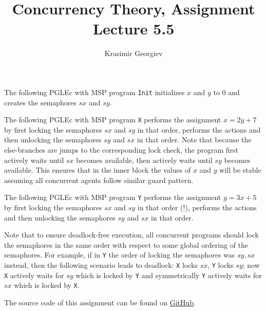 \documentclass[a4paper]{article}
\title{Concurrency Theory, Assignment Lecture 5.5}
\author{Krasimir Georgiev}
\newcommand{\prog}[1]{\texttt{#1}}
\begin{document}
\maketitle

The following PGLEc with MSP program \prog{Init} initializes $x$ and $y$ to 0
and creates the semaphores $sx$ and $sy$.


The following PGLEc with MSP program \prog{X} performs the assignment
$x = 2y + 7$ by first locking the semaphores $sx$ and $sy$ in that order,
performs the actions and then unlocking the semaphores $sy$ and $sx$ in that
order. Note that because the else-branches are jumps to the corresponding lock
check, the program first actively waits until $sx$ becomes available, then
actively waits until $sy$ becomes available. This ensures that in the inner
block the values of $x$ and $y$ will be stable assuming all concurrent agents
follow similar guard pattern.


The following PGLEc with MSP program \prog{Y} performs the assignment $y = 3x +
5$ by first locking the semaphores $sx$ and $sy$ in that order (!), performs
the actions and then unlocking the semaphores $sy$ and $sx$ in that order.


Note that to ensure deadlock-free execution, all concurrent programs should
lock the semaphores in the same order with respect to some global ordering of
the semaphores. For example, if in \prog{Y} the order of locking the semaphores
was $sy, sx$ instead, then the following scenario leads to deadlock: \prog{X}
locks $sx$, \prog{Y} locks $sy$; now \prog{X} actively waits for $sy$ which is
locked by \prog{Y} and symmetrically \prog{Y} actively waits for $sx$ which is
locked by \prog{X}.

The source code of this assignment can be found on
\href{https://github.com/comco/concurrency-theory-assignments/tree/master/assignment-lecture-5.5}{GitHub}.
\end{document}

